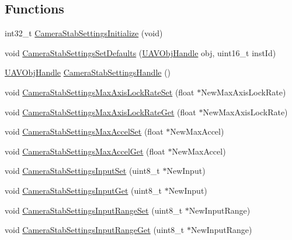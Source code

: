 \subsection*{\-Functions}
\begin{DoxyCompactItemize}
\item 
int32\-\_\-t \hyperlink{group___camera_stab_settings_gad062c053f729b7338c2192deb8e6fad4}{\-Camera\-Stab\-Settings\-Initialize} (void)
\item 
void \hyperlink{group___camera_stab_settings_ga708c2ceb3fe23ca898a93d4ea74e9411}{\-Camera\-Stab\-Settings\-Set\-Defaults} (\hyperlink{targets_2_u_a_v_objects_2inc_2uavobjectmanager_8h_a279053e22be53ce9f895043aaeb91e3b}{\-U\-A\-V\-Obj\-Handle} obj, uint16\-\_\-t inst\-Id)
\item 
\hyperlink{targets_2_u_a_v_objects_2inc_2uavobjectmanager_8h_a279053e22be53ce9f895043aaeb91e3b}{\-U\-A\-V\-Obj\-Handle} \hyperlink{group___camera_stab_settings_ga9f614bb6c97a15b63a223343b160432a}{\-Camera\-Stab\-Settings\-Handle} ()
\item 
void \hyperlink{group___camera_stab_settings_ga6ccdbd40456a0e4c38c1bf90f649eb97}{\-Camera\-Stab\-Settings\-Max\-Axis\-Lock\-Rate\-Set} (float $\ast$\-New\-Max\-Axis\-Lock\-Rate)
\item 
void \hyperlink{group___camera_stab_settings_ga9ac27bfb11a387eeb12a8db18515a123}{\-Camera\-Stab\-Settings\-Max\-Axis\-Lock\-Rate\-Get} (float $\ast$\-New\-Max\-Axis\-Lock\-Rate)
\item 
void \hyperlink{group___camera_stab_settings_ga4a10cef989eb95165fe3885cda5c7f23}{\-Camera\-Stab\-Settings\-Max\-Accel\-Set} (float $\ast$\-New\-Max\-Accel)
\item 
void \hyperlink{group___camera_stab_settings_ga676cd42214ff0129c0cfc5b8dd073e32}{\-Camera\-Stab\-Settings\-Max\-Accel\-Get} (float $\ast$\-New\-Max\-Accel)
\item 
void \hyperlink{group___camera_stab_settings_gad4dd485a58a56c2b4d320b02142d4f3a}{\-Camera\-Stab\-Settings\-Input\-Set} (uint8\-\_\-t $\ast$\-New\-Input)
\item 
void \hyperlink{group___camera_stab_settings_ga8f44959327759b104c344068be42668b}{\-Camera\-Stab\-Settings\-Input\-Get} (uint8\-\_\-t $\ast$\-New\-Input)
\item 
void \hyperlink{group___camera_stab_settings_ga8df68c180eeafc835da8cc0c7fbcabfa}{\-Camera\-Stab\-Settings\-Input\-Range\-Set} (uint8\-\_\-t $\ast$\-New\-Input\-Range)
\item 
void \hyperlink{group___camera_stab_settings_gafa3b84962f77ed711d018fcc6f388142}{\-Camera\-Stab\-Settings\-Input\-Range\-Get} (uint8\-\_\-t $\ast$\-New\-Input\-Range)

\end{DoxyCompactItemize}
